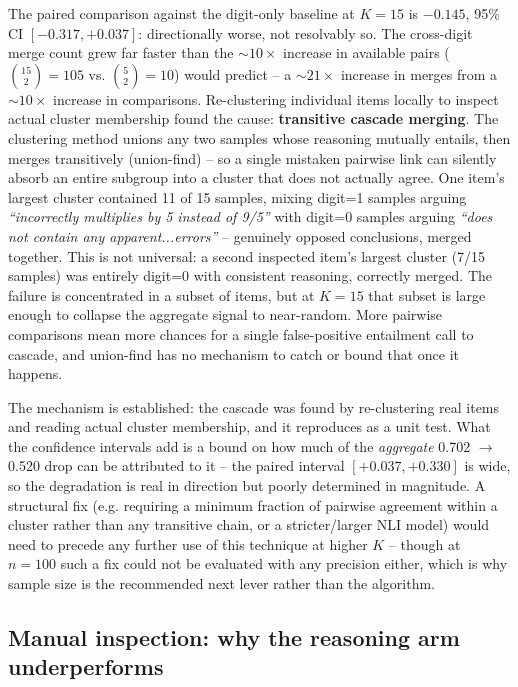 \documentclass[11pt]{article}
\begin{document}
The paired comparison against the digit-only baseline at $K=15$ is
$-0.145$, 95\% CI $[-0.317, +0.037]$: directionally worse, not resolvably so.
The cross-digit merge count grew far faster than the
$\sim 10\times$ increase in available pairs ($\binom{15}{2}=105$ vs.
$\binom{5}{2}=10$) would predict -- a $\sim 21\times$ increase in merges from a
$\sim 10\times$ increase in comparisons. Re-clustering individual items locally
to inspect actual cluster membership found the cause: \textbf{transitive
cascade merging}. The clustering method unions any two samples whose reasoning
mutually entails, then merges transitively (union-find) -- so a single
mistaken pairwise link can silently absorb an entire subgroup into a cluster
that does not actually agree. One item's largest cluster contained 11 of 15
samples, mixing digit=1 samples arguing \emph{``incorrectly multiplies by 5
instead of 9/5''} with digit=0 samples arguing \emph{``does not contain any
apparent...errors''} -- genuinely opposed conclusions, merged together. This
is not universal: a second inspected item's largest cluster (7/15 samples) was
entirely digit=0 with consistent reasoning, correctly merged. The failure is
concentrated in a subset of items, but at $K=15$ that subset is large enough to
collapse the aggregate signal to near-random. More pairwise comparisons mean
more chances for a single false-positive entailment call to cascade, and
union-find has no mechanism to catch or bound that once it happens.

The mechanism is established: the cascade was found by re-clustering real items
and reading actual cluster membership, and it reproduces as a unit test. What
the confidence intervals add is a bound on how much of the \emph{aggregate}
0.702 $\rightarrow$ 0.520 drop can be attributed to it -- the paired interval
$[+0.037, +0.330]$ is wide, so the degradation is real in direction but poorly
determined in magnitude. A structural fix (e.g. requiring a minimum fraction of
pairwise agreement within a cluster rather than any transitive chain, or a
stricter/larger NLI model) would need to precede any further use of this
technique at higher $K$ -- though at $n=100$ such a fix could not be evaluated
with any precision either, which is why sample size is the recommended next
lever rather than the algorithm.

\subsection{Manual inspection: why the reasoning arm underperforms}
\label{sec:reasoning-diagnosis}
\end{document}
